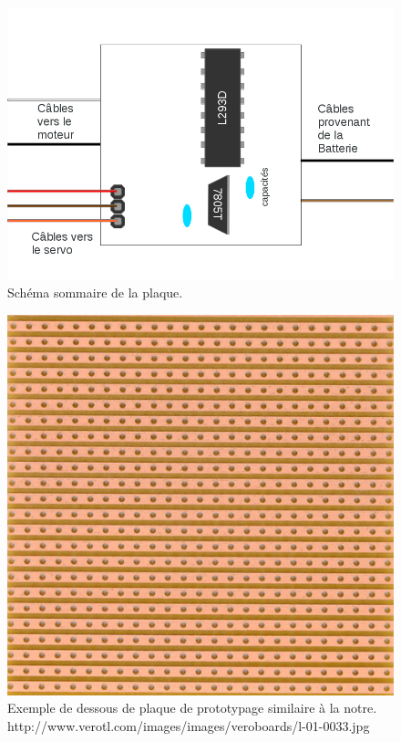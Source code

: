 \documentclass[a4paper,11pt]{report}
\begin{document}
{\begin{figure}[h]
\centering
\includegraphics[width=1.0\textwidth]{figures/SchemaPlaqueMaison}
    \caption{\label{SchemaPlaqueMaison}Schéma sommaire de la plaque.
    }
\end{figure}

\begin{figure}[h]
\centering
\includegraphics[width=1.0\textwidth]{figures/StripBoard}
    \caption{\label{StripBoard}Exemple de dessous de plaque de prototypage
      similaire à la notre. http://www.verotl.com/images/images/veroboards/l-01-0033.jpg
    }
\end{figure}

}
\end{document}
